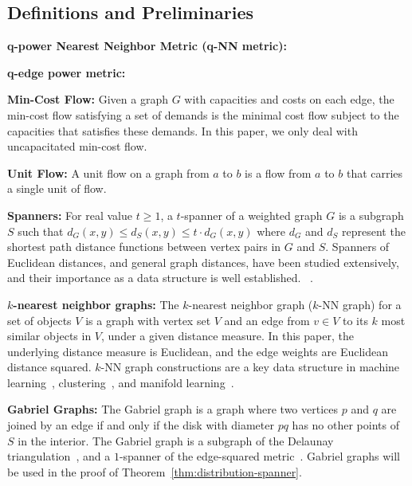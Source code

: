 
\subsection{Definitions and Preliminaries} %
\label{sec:definitions}
\noindent \textbf{q-power Nearest Neighbor Metric (q-NN metric):}

\noindent \textbf{q-edge power metric:}

\noindent \textbf{Min-Cost Flow:} Given a graph $G$ with capacities and
costs on each edge, the min-cost flow satisfying a set of demands is the
minimal cost flow subject to the capacities that satisfies these demands.
In this paper, we only deal with uncapacitated min-cost flow.

\noindent \textbf{Unit Flow:} A unit flow on a graph from $a$ to $b$ is a
flow from $a$ to $b$ that carries a single unit of flow.

\noindent \textbf{Spanners:} For real value $t \geq 1$, a $t$-spanner of
a weighted graph $G$ is a subgraph $S$ such that $d_G(x,y) \leq d_S(x,y)
\leq t\cdot d_G(x,y)$ where $d_G$ and $d_S$ represent the shortest path
distance functions between vertex pairs in $G$ and $S$. Spanners
of Euclidean distances, and general graph distances, have been
studied extensively, and their importance as a data structure is
well established.
~\cite{Chew1986, Vaidya1991, Callahan1993,HarPeled13}.

\vspace{3 mm}
\noindent \textbf{$k$-nearest neighbor graphs:} The $k$-nearest neighbor graph
($k$-NN graph) for a set of objects $V$ is a graph with vertex set $V$
and an edge from $v\in V$ to its $k$ most similar objects in $V$, under
a given distance measure. In this paper, the underlying distance
measure is Euclidean, and the edge weights are Euclidean distance
squared.
$k$-NN
graph constructions are a key data structure in machine
learning~\cite{Dong11, Chen11}, clustering~\cite{vL09}, and manifold learning~\cite{tenenbaum00global}.

\vspace{3 mm}
\noindent \textbf{Gabriel Graphs:} The Gabriel graph is a graph where
two vertices $p$ and $q$ are joined by an edge if and only if the disk
with diameter $pq$ has no other points of $S$ in the interior. The
Gabriel graph is a subgraph of the Delaunay
triangulation~\cite{SridharMaster}, and a
$1$-spanner of the edge-squared metric~\cite{SridharMaster}. Gabriel
graphs will be used in the proof of
Theorem~\ref{thm:distribution-spanner}.

